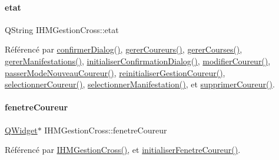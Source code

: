 \paragraph{\texorpdfstring{etat}{etat}}
{\footnotesize\ttfamily Q\+String I\+H\+M\+Gestion\+Cross\+::etat\hspace{0.3cm}{\ttfamily [private]}}



Référencé par \hyperlink{class_i_h_m_gestion_cross_a144933ab31ae263be7267b93bfd53a82}{confirmer\+Dialog()}, \hyperlink{class_i_h_m_gestion_cross_ad46a2295500cf98dbc18f862f6020103}{gerer\+Coureurs()}, \hyperlink{class_i_h_m_gestion_cross_a82e3861f4959d3599d1d85ee0b3b8654}{gerer\+Courses()}, \hyperlink{class_i_h_m_gestion_cross_a406efb83dac8a8ac5d04e9b8cbeaf316}{gerer\+Manifestations()}, \hyperlink{class_i_h_m_gestion_cross_a1d3c7f83d4c960f38b237499d2a89731}{initialiser\+Confirmation\+Dialog()}, \hyperlink{class_i_h_m_gestion_cross_a1f41cea488ab477505f9d1792c4c2f36}{modifier\+Coureur()}, \hyperlink{class_i_h_m_gestion_cross_ac8f336c95a5f0c9eb8a4bc1c4bb83445}{passer\+Mode\+Nouveau\+Coureur()}, \hyperlink{class_i_h_m_gestion_cross_a85c44933ec0dcbb591e01c832063367e}{reinitialiser\+Gestion\+Coureur()}, \hyperlink{class_i_h_m_gestion_cross_ad71963d500fd61995fdae94e833db163}{selectionner\+Coureur()}, \hyperlink{class_i_h_m_gestion_cross_a60fc58610d01534b3df66ac7dd76b4dc}{selectionner\+Manifestation()}, et \hyperlink{class_i_h_m_gestion_cross_a4fd00fda0e47366d66d046e344a1617e}{supprimer\+Coureur()}.

\mbox{\label{class_i_h_m_gestion_cross_aa776ee3d04b5e02414e4f97ace344c0c}} 
\paragraph{\texorpdfstring{fenetre\+Coureur}{fenetreCoureur}}
{\footnotesize\ttfamily \hyperlink{class_q_widget}{Q\+Widget}$\ast$ I\+H\+M\+Gestion\+Cross\+::fenetre\+Coureur\hspace{0.3cm}{\ttfamily [private]}}



Référencé par \hyperlink{class_i_h_m_gestion_cross_a2c62fd83326a87456a403f46acc408c8}{I\+H\+M\+Gestion\+Cross()}, et \hyperlink{class_i_h_m_gestion_cross_aa5d9de499a66e52b843c4ef4c6074a60}{initialiser\+Fenetre\+Coureur()}.

